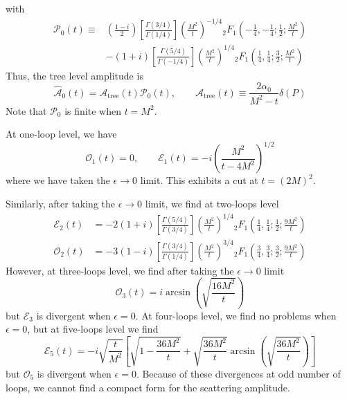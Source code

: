 with
\begin{equation}
\begin{split}
	\mathcal{P}_{0}(t) \equiv {}& \left(\frac{1 - i}{2}\right) \left[ \frac{\Gamma\left( 3/4 \right)}{\Gamma\left( 1/4 \right)} \right] \left( \frac{M^{2}}{t} \right)^{-1/4} {}_{2} F_{1} \left( -\frac{1}{4}, -\frac{1}{4}; \frac{1}{2}; \frac{M^{2}}{t} \right) \\
	& -(1 + i) \left[ \frac{\Gamma\left( 5/4 \right)}{\Gamma\left( -1/4 \right)} \right] \left( \frac{M^{2}}{t} \right)^{1/4} {}_{2} F_{1} \left( \frac{1}{4}, \frac{1}{4}; \frac{3}{2}; \frac{M^{2}}{t} \right)
\end{split}
\end{equation}
Thus, the tree level amplitude is
\begin{equation}
	\widehat{\mathcal{A}}_{0}(t) = \mathcal{A}_{\text{tree}}(t) \mathcal{P}_{0}(t), \qquad \mathcal{A}_{\text{tree}}(t) \equiv \frac{2\alpha_{0}}{M^{2} - t} \delta(P)
\end{equation}
Note that $\mathcal{P}_{0}$ is finite when $t = M^{2}$.

At one-loop level, we have
\begin{equation}
	\mathcal{O}_{1}(t) = 0, \qquad \mathcal{E}_{1}(t) = -i \left( \frac{M^{2}}{t - 4M^{2}} \right)^{1/2}
\end{equation}
where we have taken the $\epsilon \rightarrow 0$ limit. This exhibits a cut at $t = (2M)^{2}$.

Similarly, after taking the $\epsilon \rightarrow 0$ limit, we find at two-loops level
\begin{align}
	\mathcal{E}_{2}(t) &= -2(1 + i) \left[ \frac{\Gamma(5/4)}{\Gamma(3/4)} \right] \left( \frac{M^{2}}{t} \right)^{1/4} {}_{2}F_{1}\left( \frac{1}{4}, \frac{1}{4}; \frac{1}{2}; \frac{9M^{2}}{t} \right)  \\
	\mathcal{O}_{2}(t) &= -3(1 - i) \left[ \frac{\Gamma(3/4)}{\Gamma(1/4)} \right] \left( \frac{M^{2}}{t} \right)^{3/4} {}_{2}F_{1}\left( \frac{3}{4}, \frac{3}{4}; \frac{3}{2}; \frac{9M^{2}}{t} \right)
\end{align}
However, at three-loops level, we find after taking the $\epsilon \rightarrow 0$ limit
\begin{equation}
	\mathcal{O}_{3}(t) = i \arcsin{\left( \sqrt{\frac{16M^{2}}{t}} \right)}
\end{equation}
but $\mathcal{E}_{3}$ is divergent when $\epsilon = 0$. At four-loops level, we find no problems when $\epsilon = 0$, but at five-loops level we find
\begin{equation}
	\mathcal{E}_{5}(t) = -i \sqrt{\frac{t}{M^{2}}} \left[ \sqrt{1 - \frac{36 M^{2}}{t}} +  \sqrt{\frac{36 M^{2}}{t}} \arcsin{\left( \sqrt{\frac{36M^{2}}{t}} \right)} \right]
\end{equation}
but $\mathcal{O}_{5}$ is divergent when $\epsilon = 0$. Because of these divergences at odd number of loops, we cannot find a compact form for the scattering amplitude.